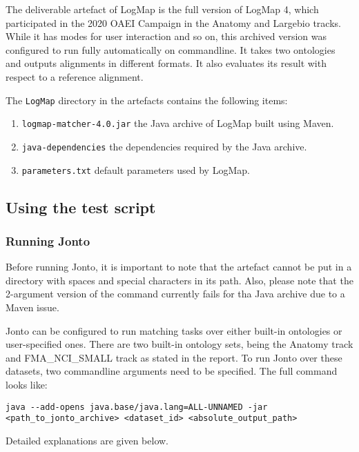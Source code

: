 \begin{appendices}
The deliverable artefact of LogMap is the full version of LogMap 4,
which participated in the 2020 OAEI Campaign in the Anatomy and Largebio
tracks. While it has modes for user interaction and so on, this archived
version was configured to run fully automatically on commandline. It
takes two ontologies and outputs alignments in different formats. It
also evaluates its result with respect to a reference alignment.

The \texttt{LogMap} directory in the artefacts contains the following
items:

\begin{enumerate}
\def\labelenumi{\arabic{enumi}.}
\item
  \texttt{logmap-matcher-4.0.jar} the Java archive of LogMap built using
  Maven.
\item
  \texttt{java-dependencies} the dependencies required by the Java
  archive.
\item
  \texttt{parameters.txt} default parameters used by LogMap.
\end{enumerate}

\subsection{Using the test script}\label{using-the-test-script}

\subsubsection{Running Jonto}\label{running-jonto}

Before running Jonto, it is important to note that the artefact cannot
be put in a directory with spaces and special characters in its path.
Also, please note that the 2-argument version of the command currently
fails for tha Java archive due to a Maven issue.

Jonto can be configured to run matching tasks over either built-in
ontologies or user-specified ones. There are two built-in ontology sets,
being the Anatomy track and FMA\_NCI\_SMALL track as stated in the
report. To run Jonto over these datasets, two commandline arguments need
to be specified. The full command looks like:

\texttt{java -{}-add-opens java.base/java.lang=ALL-UNNAMED -jar \textless{}path\_to\_jonto\_archive\textgreater{} \textless{}dataset\_id\textgreater{} \textless{}absolute\_output\_path\textgreater{}}

Detailed explanations are given below.


\end{appendices}
